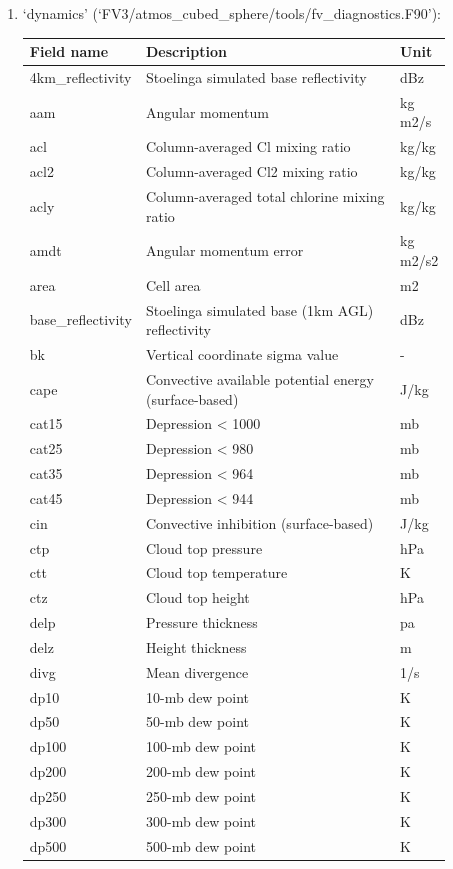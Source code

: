 \documentclass[11pt,fleqn]{report}              %
\begin{document}
\begin{enumerate}
\begin{enumerate}
\item `dynamics' (`FV3/atmos\_cubed\_sphere/tools/fv\_diagnostics.F90'):
{
\scriptsize
\begin{longtable}{p{0.17\linewidth} | p{0.6\linewidth} | p{0.11\linewidth} }
\hline
\hline
Field name & Description & Unit \\
\hline 
 4km\_reflectivity & Stoelinga simulated base reflectivity & dBz \\
 aam & Angular momentum & kg m2/s \\
 acl & Column-averaged Cl mixing ratio & kg/kg \\
 acl2 & Column-averaged Cl2 mixing ratio & kg/kg \\
 acly & Column-averaged total chlorine mixing ratio & kg/kg \\
 amdt & Angular momentum error & kg m2/s2 \\
 area & Cell area & m2 \\
 base\_reflectivity & Stoelinga simulated base (1km AGL) reflectivity & dBz \\
 bk & Vertical coordinate sigma value & - \\
 cape & Convective available potential energy (surface-based) & J/kg \\
 cat15 & Depression < 1000 & mb \\
 cat25 & Depression < 980 & mb \\
 cat35 & Depression < 964 & mb \\
 cat45 & Depression < 944 & mb \\
 cin & Convective inhibition (surface-based) & J/kg \\
 ctp & Cloud top pressure & hPa \\
 ctt & Cloud top temperature & K \\
 ctz & Cloud top height & hPa \\ 
 delp & Pressure thickness & pa \\
 delz & Height thickness & m \\
 divg & Mean divergence & 1/s \\
 dp10 & 10-mb dew point & K \\
 dp50 & 50-mb dew point & K \\
 dp100 & 100-mb dew point & K \\
 dp200 & 200-mb dew point & K \\
 dp250 & 250-mb dew point & K \\
 dp300 & 300-mb dew point & K \\
 dp500 & 500-mb dew point & K \\

\end{longtable}}
\end{enumerate}
\end{enumerate}
\end{document}
